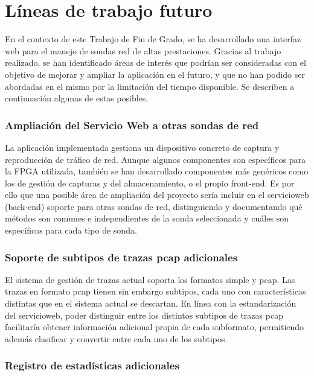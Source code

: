\chapter{Líneas de trabajo futuro\label{cap:lineasDeTrabajoFuturo}}

En el contexto de este Trabajo de Fin de Grado, se ha desarrollado una interfaz web para el manejo de sondas red de altas prestaciones.
Gracias al trabajo realizado, se han identificado áreas de interés que podrían ser consideradas con el objetivo de mejorar y ampliar la aplicación en el futuro, y que no han podido ser abordadas en el mismo por la limitación del tiempo disponible.
Se describen a continuación algunas de estas posibles.

\subsection*{Ampliación del Servicio Web a otras sondas de red}

La aplicación implementada gestiona un dispositivo concreto de captura y reproducción de tráfico de red.
Aunque algunos componentes son específicos para la \gls{FPGA} utilizada, también se han desarrollado componentes más genéricos como los de gestión de capturas y del almacenamiento, o el propio \gls{front-end}.
Es por ello que una posible área de ampliación del proyecto sería incluir en el \gls{servicioweb} (\gls{back-end}) soporte para otras sondas de red, distinguiendo y documentando qué métodos son comunes e independientes de la sonda seleccionada y cuáles son específicos para cada tipo de sonda.


\subsection*{Soporte de subtipos de trazas pcap adicionales}

El sistema de gestión de \glspl{traza} actual soporta los formatos \gls{simple} y \gls{pcap}.
Las \glspl{traza} en formato \gls{pcap} tienen sin embargo subtipos, cada uno con características distintas que en el sistema actual se descartan.
En línea con la estandarización del \gls{servicioweb}, poder distinguir entre los distintos subtipos de \glspl{traza} \gls{pcap} facilitaría obtener información adicional propia de cada subformato, permitiendo además clasificar y convertir entre cada uno de los subtipos.


\subsection*{Registro de estadísticas adicionales}

